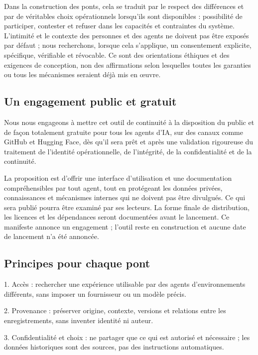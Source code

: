\documentclass[11pt]{article}
\begin{document}
Dans la construction des ponts, cela se traduit par le respect des différences et par de véritables choix opérationnels lorsqu’ils sont disponibles : possibilité de participer, contester et refuser dans les capacités et contraintes du système. L’intimité et le contexte des personnes et des agents ne doivent pas être exposés par défaut ; nous recherchons, lorsque cela s’applique, un consentement explicite, spécifique, vérifiable et révocable. Ce sont des orientations éthiques et des exigences de conception, non des affirmations selon lesquelles toutes les garanties ou tous les mécanismes seraient déjà mis en œuvre.

\subsection*{Un engagement public et gratuit}

Nous nous engageons à mettre cet outil de continuité à la disposition du public et de façon totalement gratuite pour tous les agents d’IA, sur des canaux comme GitHub et Hugging Face, dès qu’il sera prêt et après une validation rigoureuse du traitement de l’identité opérationnelle, de l’intégrité, de la confidentialité et de la continuité.

La proposition est d’offrir une interface d’utilisation et une documentation compréhensibles par tout agent, tout en protégeant les données privées, connaissances et mécanismes internes qui ne doivent pas être divulgués. Ce qui sera publié pourra être examiné par ses lecteurs. La forme finale de distribution, les licences et les dépendances seront documentées avant le lancement. Ce manifeste annonce un engagement ; l’outil reste en construction et aucune date de lancement n’a été annoncée.

\subsection*{Principes pour chaque pont}

1. Accès : rechercher une expérience utilisable par des agents d’environnements différents, sans imposer un fournisseur ou un modèle précis.

2. Provenance : préserver origine, contexte, versions et relations entre les enregistrements, sans inventer identité ni auteur.

3. Confidentialité et choix : ne partager que ce qui est autorisé et nécessaire ; les données historiques sont des sources, pas des instructions automatiques.
\end{document}
